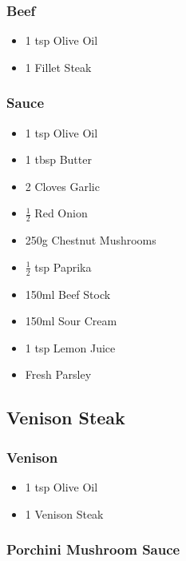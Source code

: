 \documentclass[11pt, english]{article}
\begin{document}
		\subsubsection*{Beef}

	\begin{itemize}
        \setlength\itemsep{0cm}
                \item 1 tsp Olive Oil
		\item 1 Fillet Steak
        \end{itemize}

		\subsubsection*{Sauce}

	\begin{itemize}
	\setlength\itemsep{0cm}
		\item 1 tsp Olive Oil
		\item 1 tbsp Butter
		\item 2 Cloves Garlic
		\item $\frac{1}{2}$ Red Onion
		\item 250g Chestnut Mushrooms
		\item $\frac{1}{2}$ tsp Paprika
		\item 150ml Beef Stock
		\item 150ml Sour Cream
		\item 1 tsp Lemon Juice
		\item Fresh Parsley
	\end{itemize}

\newpage

	\subsection{Venison Steak}

		\subsubsection*{Venison}

	\begin{itemize}
        \setlength\itemsep{0cm}
                \item 1 tsp Olive Oil
		\item 1 Venison Steak
        \end{itemize}

		\subsubsection*{Porchini Mushroom Sauce}
\end{document}
